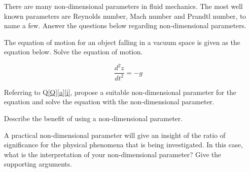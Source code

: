 \question{}\label{Q}

\listbeginx	%

	\item \label{a} There are many non-dimensional parameters in fluid mechanics. The most well known parameters are Reynolds number, Mach number and Prandtl number, to name a few. Answer the questions below regarding non-dimensional parameters.  
	
		
		\listbegin

\item \label{i} The equation of motion for an object falling in a vacuum space is given as the equation below. Solve the equation of motion.


\begin{equation}
\nonumber
\frac{d^{2}z}{dt^{2}} = -g
\end{equation}
		

\item Referring to Q\ref{Q}\ref{a}\ref{i}, propose a suitable non-dimensional parameter for the equation and solve the equation with the non-dimensional parameter.
  


	\item Describe the benefit of using a non-dimensional parameter.	
	



	\item A practical non-dimensional parameter will give an insight of the ratio of significance for the physical phenomena that is being investigated. In this case, what is the interpretation of your non-dimensional parameter? Give the supporting arguments.  		


